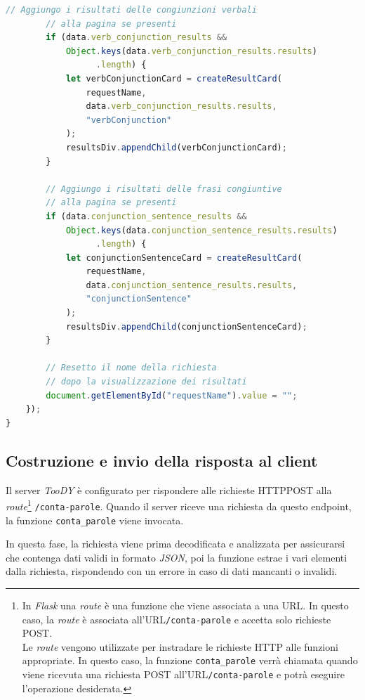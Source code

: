 \documentclass[12pt]{report}
\newcommand{\toody}{\textsl{TooDY}\xspace}
\newcommand{\flask}{\textsl{Flask}\xspace}
\newcommand{\json}{\textsl{JSON}\xspace}
\newcommand{\URL}{\textsf{URL}\xspace}
\newcommand{\http}{\textsf{HTTP}\xspace}
\newcommand{\post}{\textsf{POST}\xspace}
\begin{document}
\begin{lstlisting}[language=JavaScript]
        // Aggiungo i risultati delle congiunzioni verbali
        // alla pagina se presenti
        if (data.verb_conjunction_results &&
            Object.keys(data.verb_conjunction_results.results)
                  .length) {
            let verbConjunctionCard = createResultCard(
                requestName,
                data.verb_conjunction_results.results,
                "verbConjunction"
            );
            resultsDiv.appendChild(verbConjunctionCard);
        }

        // Aggiungo i risultati delle frasi congiuntive
        // alla pagina se presenti
        if (data.conjunction_sentence_results &&
            Object.keys(data.conjunction_sentence_results.results)
                  .length) {
            let conjunctionSentenceCard = createResultCard(
                requestName,
                data.conjunction_sentence_results.results,
                "conjunctionSentence"
            );
            resultsDiv.appendChild(conjunctionSentenceCard);
        }

        // Resetto il nome della richiesta
        // dopo la visualizzazione dei risultati
        document.getElementById("requestName").value = "";
    });
}
\end{lstlisting}




\subsection{Costruzione e invio della risposta al client}
Il server \toody è configurato per rispondere alle richieste \http \post alla \textit{route}\footnote{In \flask una \textit{route} è una funzione che viene associata a una \URL. In questo caso, la \textit{route} è associata all'\URL \texttt{/conta-parole} e accetta solo richieste \post.\\
Le \textit{route} vengono utilizzate per instradare le richieste \http alle funzioni appropriate. In questo caso, la funzione \texttt{conta\_parole} verrà chiamata quando viene ricevuta una richiesta \post all'\URL \texttt{/conta-parole} e potrà eseguire l'operazione desiderata.} \texttt{/conta-parole}. Quando il server riceve una richiesta da questo endpoint, la funzione \texttt{conta\_parole} viene invocata.

In questa fase, la richiesta viene prima decodificata e analizzata per assicurarsi che contenga dati validi in formato \json, poi la funzione estrae i vari elementi dalla richiesta, rispondendo con un errore in caso di dati mancanti o invalidi.
\end{document}
